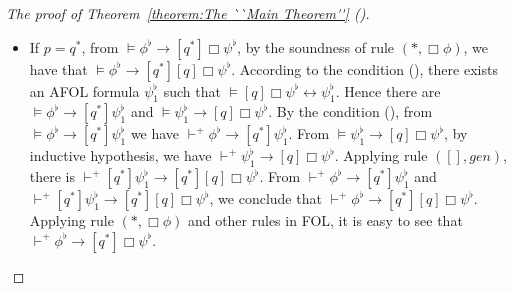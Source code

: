 \documentclass{fcs}
\newcommand{\rmn}[1]{(\romannumeral#1)}
\newcommand{\reld}[0]{\mathit{\vdash^+}}
\begin{document}
\begin{proof}[The proof of Theorem~\ref{theorem:The ``Main Theorem''} \rmn{4}]
\begin{itemize}
    \item If $p=q^*$, from $\models \phi^\flat\to [q^*]\Box\psi^\flat$, by the soundness of rule $(*, \Box\phi)$, we have that $\models \phi^\flat\to [q^*][q]\Box\psi^\flat$.
    According to the condition \rmn{1}, there exists an AFOL formula $\psi^\flat_1$ such that $\models [q]\Box\psi^\flat\leftrightarrow \psi^\flat_1$.
    Hence there are $\models \phi^\flat\to [q^*]\psi^\flat_1$ and $\models \psi^\flat_1\to [q]\Box\psi^\flat$.
    By the condition \rmn{2}, from $\models \phi^\flat\to [q^*]\psi^\flat_1$ we have $\reld \phi^\flat\to [q^*]\psi^\flat_1$.
    From $\models \psi^\flat_1\to [q]\Box\psi^\flat$, by inductive hypothesis, we have $\reld \psi^\flat_1\to [q]\Box\psi^\flat$.
    Applying rule $([],\mathit{gen})$, there is $\reld [q^*]\psi^\flat_1\to [q^*][q]\Box\psi^\flat$.
    From $\reld \phi^\flat\to [q^*]\psi^\flat_1$ and $\reld [q^*]\psi^\flat_1\to [q^*][q]\Box\psi^\flat$, we conclude that $\reld \phi^\flat\to [q^*][q]\Box\psi^\flat$.
    Applying rule $(*, \Box\phi)$ and other rules in FOL, it is easy to see that $\reld \phi^\flat \to [q^*]\Box\psi^\flat$.

    \end{itemize}
\end{proof}





%
%
\end{document}
